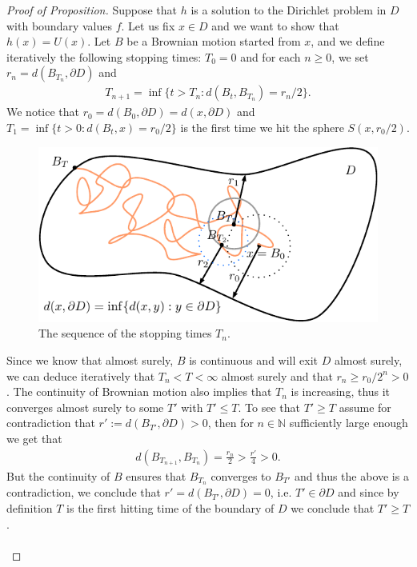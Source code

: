 \documentclass[../mainfile.tex]{subfiles}
\begin{document}
\begin{proof}[Proof of Proposition] Suppose that $h$ is a solution to the Dirichlet problem in $D$ with boundary values $f$. Let us fix $x \in D$ and we want to show that $h(x)=U(x)$. Let $B$ be a Brownian motion started from $x$, and we define iteratively the following stopping times: $T_0=0$ and for each $n \geq 0$, we set $r_n=d(B_{T_n}, \partial D)$ and 
\begin{align*}
T_{n+1} = \inf \{ t > T_n : d(B_t, B_{T_n}) = r_n/2 \}. 
\end{align*}
We notice that $r_0=d(B_0, \partial D)=d(x, \partial D)$ and $T_1 = \inf \{ t >0: d(B_t,x) = r_0/2\}$ is the first time we hit the sphere $S(x,r_0/2)$. 
\begin{figure}[hbtp]
\centering
\includegraphics[scale=1.2]{proofwendi.pdf}
\caption{The sequence of the stopping times $T_n$.}
\end{figure}
\newpage
Since we know that almost surely, $B$ is continuous and will exit $D$ almost surely, we can deduce iteratively that $T_n < T < \infty$ almost surely and that $r_n \geq r_0/2^n >0$. 
 The continuity of Brownian motion also implies that $T_n$ is increasing, thus it converges almost surely to some $T'$ with $T' \leq T$. To see that $T' \geq T$ assume for contradiction that $r':= d(B_{T'}, \partial D) >0$, then for $n \in \mathbb{N}$ sufficiently large enough we get that 
 \begin{align*}
d(B_{T_{n+1}}, B_{T_n})= \frac{r_n}{2} > \frac{r'}{4}>0.
 \end{align*}
But the continuity of $B$ ensures that $B_{T_n}$ converges to $B_{T'}$ and thus the above is a contradiction, we conclude that $r'= d(B_{T'}, \partial D)=0$, i.e. $T' \in \partial D$ and since by definition $T$ is the first hitting time of the boundary of $D$ we conclude that $T' \geq T$. \\
\\

\end{proof}
\end{document}
